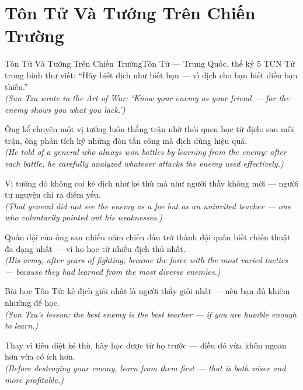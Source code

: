 \section{Tôn Tử Và Tướng Trên Chiến Trường}
\begin{truyen}{Tôn Tử Và Tướng Trên Chiến Trường}{Tôn Tử --- Trung Quốc, thế kỷ 5 TCN}
 Tử trong binh thư viết: ``Hãy biết địch như biết bạn --- vì địch cho bạn biết điều bạn thiếu.''\\[4pt]
\textit{(Sun Tzu wrote in the Art of War: `Know your enemy as your friend --- for the enemy shows you what you lack.')}

Ông kể chuyện một vị tướng luôn thắng trận nhờ thói quen học từ địch: sau mỗi trận, ông phân tích kỹ những đòn tấn công mà địch dùng hiệu quả.\\[4pt]
\textit{(He told of a general who always won battles by learning from the enemy: after each battle, he carefully analyzed whatever attacks the enemy used effectively.)}

Vị tướng đó không coi kẻ địch như kẻ thù mà như người thầy không mời --- người tự nguyện chỉ ra điểm yếu.\\[4pt]
\textit{(That general did not see the enemy as a foe but as an uninvited teacher --- one who voluntarily pointed out his weaknesses.)}

Quân đội của ông sau nhiều năm chiến đấu trở thành đội quân biết chiến thuật đa dạng nhất --- vì họ học từ nhiều địch thủ nhất.\\[4pt]
\textit{(His army, after years of fighting, became the force with the most varied tactics --- because they had learned from the most diverse enemies.)}

Bài học Tôn Tử: kẻ địch giỏi nhất là người thầy giỏi nhất --- nếu bạn đủ khiêm nhường để học.\\[4pt]
\textit{(Sun Tzu's lesson: the best enemy is the best teacher --- if you are humble enough to learn.)}

\end{truyen}
\begin{baihoc}
  Thay vì tiêu diệt kẻ thù, hãy học được từ họ trước --- điều đó vừa khôn ngoan hơn vừa có ích hơn.\\[4pt]
  \textit{(Before destroying your enemy, learn from them first --- that is both wiser and more profitable.)}
\end{baihoc}

